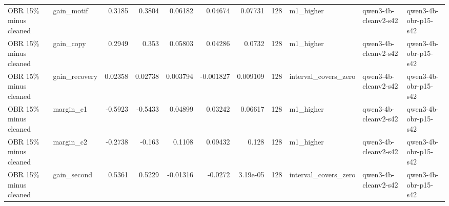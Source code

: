 \begin{tabular}{llrrrrrrlll}
OBR 15\% minus cleaned & gain\_motif & 0.3185 & 0.3804 & 0.06182 & 0.04674 & 0.07731 & 128 & m1\_higher & qwen3-4b-cleanv2-s42 & qwen3-4b-obr-p15-s42 \\
OBR 15\% minus cleaned & gain\_copy & 0.2949 & 0.353 & 0.05803 & 0.04286 & 0.0732 & 128 & m1\_higher & qwen3-4b-cleanv2-s42 & qwen3-4b-obr-p15-s42 \\
OBR 15\% minus cleaned & gain\_recovery & 0.02358 & 0.02738 & 0.003794 & -0.001827 & 0.009109 & 128 & interval\_covers\_zero & qwen3-4b-cleanv2-s42 & qwen3-4b-obr-p15-s42 \\
OBR 15\% minus cleaned & margin\_c1 & -0.5923 & -0.5433 & 0.04899 & 0.03242 & 0.06617 & 128 & m1\_higher & qwen3-4b-cleanv2-s42 & qwen3-4b-obr-p15-s42 \\
OBR 15\% minus cleaned & margin\_c2 & -0.2738 & -0.163 & 0.1108 & 0.09432 & 0.128 & 128 & m1\_higher & qwen3-4b-cleanv2-s42 & qwen3-4b-obr-p15-s42 \\
OBR 15\% minus cleaned & gain\_second & 0.5361 & 0.5229 & -0.01316 & -0.0272 & 3.19e-05 & 128 & interval\_covers\_zero & qwen3-4b-cleanv2-s42 & qwen3-4b-obr-p15-s42 \\
\bottomrule
\end{tabular}
